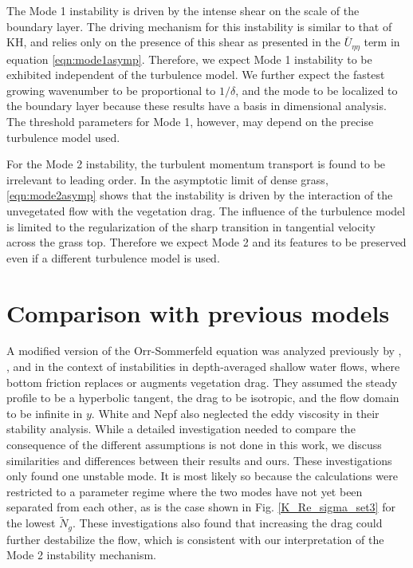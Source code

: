 \documentclass[12pt]{report}   %
\newcommand{\Ndg}{\tilde{N}_g}
\renewcommand{\bar}{\overline}
\begin{document}
The Mode 1 instability is driven by the intense shear on the scale of the boundary layer.
The driving mechanism for this instability is similar to that of KH, and relies only on the presence of this shear as presented in the $\bar{U}_{\eta\eta}$ term in equation \eqref{eqn:mode1asymp}. 
Therefore, we expect Mode 1 instability to be exhibited independent of the turbulence model. 
We further expect the fastest growing wavenumber to be proportional to $1/\delta$, and the mode to be localized to the boundary layer because these results have a basis in dimensional analysis.
The threshold parameters for Mode 1, however, may depend on the precise turbulence model used.
 
For the Mode 2 instability, the turbulent momentum transport is found to be irrelevant to leading order.
In the asymptotic limit of dense grass, \eqref{eqn:mode2asymp} shows that the instability is driven by the interaction of the unvegetated flow with the vegetation drag.
The influence of the turbulence model is limited to the regularization of the sharp transition in tangential velocity across the grass top.
Therefore we expect Mode 2 and its features to be preserved even if a different turbulence model is used.
\section{Comparison with previous models}

A modified version of the Orr-Sommerfeld equation was analyzed previously by \cite{Chu91}, \cite{Chen97}, and \cite{White07} in the context of instabilities in depth-averaged shallow water flows, where bottom friction replaces or augments vegetation drag.
They assumed the steady profile to be a hyperbolic tangent, the drag to be isotropic, and the flow domain to be infinite in $y$.
White and Nepf \cite{White07} also neglected the eddy viscosity in their stability analysis.
While a detailed investigation needed to compare the consequence of the different assumptions is not done in this work, we discuss similarities and differences between their results and ours.
These investigations only found one unstable mode.
It is most likely so because the calculations were restricted to a parameter regime where the two modes have not yet been separated from each other, as is the case shown in Fig. \ref{K_Re_sigma_set3} for the lowest $\Ndg$.
These investigations also found that increasing the drag could further destabilize the flow, which is consistent with our interpretation of the Mode 2 instability mechanism.
\end{document}
